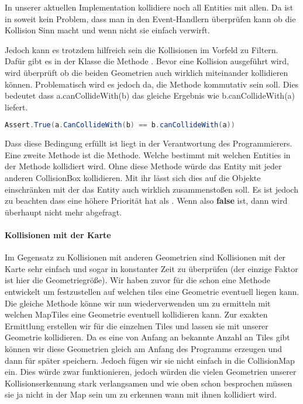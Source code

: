 In unserer aktuellen Implementation kollidiere noch all Entities mit allen. Da ist in soweit kein Problem, dass man in den Event-Handlern überprüfen kann ob die Kollision Sinn macht und wenn nicht sie einfach verwirft.

Jedoch kann es trotzdem hilfreich sein die Kollisionen im Vorfeld zu Filtern. Dafür gibt es in der Klasse  die Methode . Bevor eine Kollision ausgeführt wird, wird überprüft ob die beiden Geometrien auch wirklich miteinander kollidieren können. 
Problematisch wird es jedoch da, die Methode kommutativ sein soll.
Dies bedeutet dass a.canCollideWith(b) das gleiche Ergebnis wie b.canCollideWith(a) liefert. 

\doinline
\begin{lstlisting}[caption=Kommutative Eigenschaft von canCollideWith, title=\hspace{0 pt}, language=java]
Assert.True(a.CanCollideWith(b) == b.canCollideWith(a))
\end{lstlisting}

Dass diese Bedingung erfüllt ist liegt in der Verantwortung des Programmierers. Eine zweite Methode ist die  Methode. Welche bestimmt mit welchen Entities in der  Methode kollidiert wird. Ohne diese Methode würde das Entity mit jeder anderen CollisionBox kollidieren. Mit ihr lässt sich dies auf die Objekte einschränken mit der das Entity auch wirklich zusammenstoßen soll. Es ist jedoch zu beachten dass  eine höhere Priorität hat als . Wenn also  \textbf{false} ist, dann wird  überhaupt nicht mehr abgefragt.

\paragraph{Kollisionen mit der Karte}

Im Gegensatz zu Kollisionen mit anderen Geometrien sind Kollisionen mit der Karte sehr einfach und sogar in konstanter Zeit zu überprüfen (der einzige Faktor ist hier die Geometriegröße).
Wir haben zuvor für die  schon eine Methode entwickelt um festzustellen auf welchen tiles eine Geometrie eventuell liegen kann.
Die gleiche Methode könne wir nun wiederverwenden um zu ermitteln mit welchen MapTiles eine Geometrie eventuell kollidieren kann. Zur exakten Ermittlung erstellen wir  für die einzelnen Tiles und lassen sie mit unserer Geometrie kollidieren. Da es eine von Anfang an bekannte Anzahl an Tiles gibt können wir diese Geometrien gleich am Anfang des Programms erzeugen und dann für später speichern. 
Jedoch fügen wir sie nicht einfach in die CollisionMap ein. Dies würde zwar funktionieren, jedoch würden die vielen Geometrien unserer Kollisionserkennung stark verlangsamen und wie oben schon besprochen müssen sie ja nicht in der Map sein um zu erkennen wann mit ihnen kollidiert wird.

